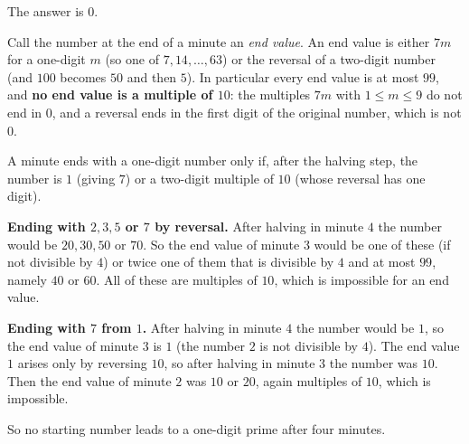 The answer is $\boxed{0}$.

Call the number at the end of a minute an \emph{end value}. An end value is either $7m$ for a one-digit $m$ (so one of $7,14,\dots,63$) or the reversal of a two-digit number (and $100$ becomes $50$ and then $5$). In particular every end value is at most $99$, and \textbf{no end value is a multiple of $10$}: the multiples $7m$ with $1\le m\le9$ do not end in $0$, and a reversal ends in the first digit of the original number, which is not $0$.

A minute ends with a one-digit number only if, after the halving step, the number is $1$ (giving $7$) or a two-digit multiple of $10$ (whose reversal has one digit).

\textbf{Ending with $2,3,5$ or $7$ by reversal.} After halving in minute $4$ the number would be $20,30,50$ or $70$. So the end value of minute $3$ would be one of these (if not divisible by $4$) or twice one of them that is divisible by $4$ and at most $99$, namely $40$ or $60$. All of these are multiples of $10$, which is impossible for an end value.

\textbf{Ending with $7$ from $1$.} After halving in minute $4$ the number would be $1$, so the end value of minute $3$ is $1$ (the number $2$ is not divisible by $4$). The end value $1$ arises only by reversing $10$, so after halving in minute $3$ the number was $10$. Then the end value of minute $2$ was $10$ or $20$, again multiples of $10$, which is impossible.

So no starting number leads to a one-digit prime after four minutes.
